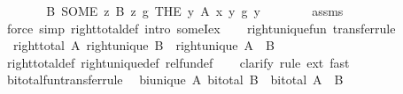 \begin{isabellebody}
\ \ \ \ \isamarkupfalse%
\ \isamarkupfalse%
\ {\isachardoublequoteopen}B\ {\isacharparenleft}{\kern0pt}SOME\ z{\isachardot}{\kern0pt}\ B\ z\ {\isacharparenleft}{\kern0pt}g\ {\isacharparenleft}{\kern0pt}THE\ y{\isachardot}{\kern0pt}\ A\ x\ y{\isacharparenright}{\kern0pt}{\isacharparenright}{\kern0pt}{\isacharparenright}{\kern0pt}\ {\isacharparenleft}{\kern0pt}g\ y{\isacharparenright}{\kern0pt}{\isachardoublequoteclose}\isanewline
\ \ \ \ \ \ \isamarkupfalse%
\ assms\ \isamarkupfalse%
\ {\isacharparenleft}{\kern0pt}force\ simp{\isacharcolon}{\kern0pt}\ right{\isacharunderscore}{\kern0pt}total{\isacharunderscore}{\kern0pt}def\ intro{\isacharcolon}{\kern0pt}\ someI{\isacharunderscore}{\kern0pt}ex{\isacharparenright}{\kern0pt}\isanewline
\ \ \isamarkupfalse%
\isanewline
{}\isamarkupfalse%
%
\endisatagproof
{\isafoldproof}%
%
\isadelimproof
\isanewline
%
\endisadelimproof
\isanewline
{}\isamarkupfalse%
\ right{\isacharunderscore}{\kern0pt}unique{\isacharunderscore}{\kern0pt}fun\ {\isacharbrackleft}{\kern0pt}transfer{\isacharunderscore}{\kern0pt}rule{\isacharbrackright}{\kern0pt}{\isacharcolon}{\kern0pt}\isanewline
\ \ {\isachardoublequoteopen}{\isasymlbrakk}right{\isacharunderscore}{\kern0pt}total\ A{\isacharsemicolon}{\kern0pt}\ right{\isacharunderscore}{\kern0pt}unique\ B{\isasymrbrakk}\ {\isasymLongrightarrow}\ right{\isacharunderscore}{\kern0pt}unique\ {\isacharparenleft}{\kern0pt}A\ {\isacharequal}{\kern0pt}{\isacharequal}{\kern0pt}{\isacharequal}{\kern0pt}{\isachargreater}{\kern0pt}\ B{\isacharparenright}{\kern0pt}{\isachardoublequoteclose}\isanewline
%
\isadelimproof
\ \ %
\endisadelimproof
%
\isatagproof
{}\isamarkupfalse%
\ right{\isacharunderscore}{\kern0pt}total{\isacharunderscore}{\kern0pt}def\ right{\isacharunderscore}{\kern0pt}unique{\isacharunderscore}{\kern0pt}def\ rel{\isacharunderscore}{\kern0pt}fun{\isacharunderscore}{\kern0pt}def\isanewline
\ \ \isamarkupfalse%
\ {\isacharparenleft}{\kern0pt}clarify{\isacharcomma}{\kern0pt}\ rule\ ext{\isacharcomma}{\kern0pt}\ fast{\isacharparenright}{\kern0pt}%
\endisatagproof
{\isafoldproof}%
%
\isadelimproof
\isanewline
%
\endisadelimproof
\isanewline
{}\isamarkupfalse%
\ bi{\isacharunderscore}{\kern0pt}total{\isacharunderscore}{\kern0pt}fun{\isacharbrackleft}{\kern0pt}transfer{\isacharunderscore}{\kern0pt}rule{\isacharbrackright}{\kern0pt}{\isacharcolon}{\kern0pt}\isanewline
\ \ {\isachardoublequoteopen}{\isasymlbrakk}bi{\isacharunderscore}{\kern0pt}unique\ A{\isacharsemicolon}{\kern0pt}\ bi{\isacharunderscore}{\kern0pt}total\ B{\isasymrbrakk}\ {\isasymLongrightarrow}\ bi{\isacharunderscore}{\kern0pt}total\ {\isacharparenleft}{\kern0pt}A\ {\isacharequal}{\kern0pt}{\isacharequal}{\kern0pt}{\isacharequal}{\kern0pt}{\isachargreater}{\kern0pt}\ B{\isacharparenright}{\kern0pt}{\isachardoublequoteclose}\isanewline

\end{isabellebody}

